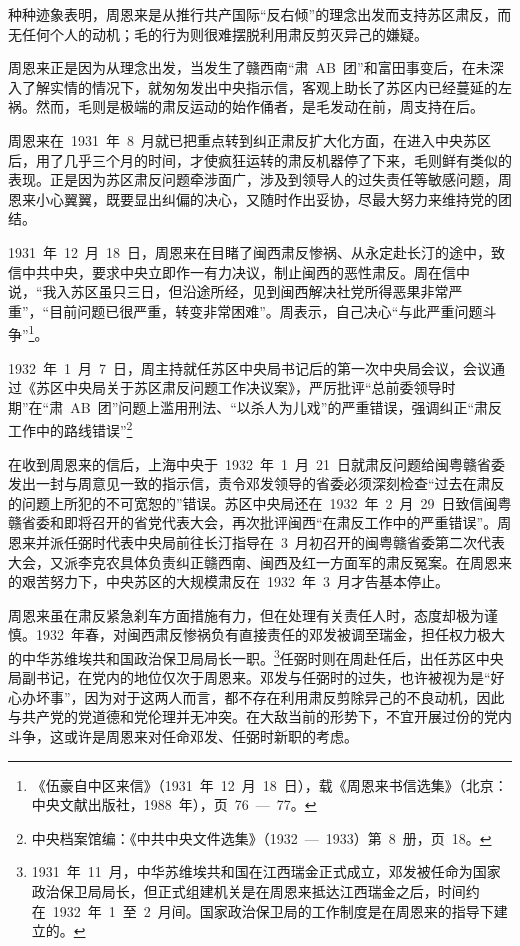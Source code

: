 种种迹象表明，周恩来是从推行共产国际“反右倾”的理念出发而支持苏区肃反，而无任何个人的动机；毛的行为则很难摆脱利用肃反剪灭异己的嫌疑。

周恩来正是因为从理念出发，当发生了赣西南“肃~AB~团”和富田事变后，在未深入了解实情的情况下，就匆匆发出中央指示信，客观上助长了苏区内已经蔓延的左祸。然而，毛则是极端的肃反运动的始作俑者，是毛发动在前，周支持在后。

周恩来在~1931~年~8~月就已把重点转到纠正肃反扩大化方面，在进入中央苏区后，用了几乎三个月的时间，才使疯狂运转的肃反机器停了下来，毛则鲜有类似的表现。正是因为苏区肃反问题牵涉面广，涉及到领导人的过失责任等敏感问题，周恩来小心翼翼，既要显出纠偏的决心，又随时作出妥协，尽最大努力来维持党的团结。

1931~年~12~月~18~日，周恩来在目睹了闽西肃反惨祸、从永定赴长汀的途中，致信中共中央，要求中央立即作一有力决议，制止闽西的恶性肃反。周在信中说，“我入苏区虽只三日，但沿途所经，见到闽西解决社党所得恶果非常严重”，“目前问题已很严重，转变非常困难”。周表示，自己决心“与此严重问题斗争”\footnote{《伍豪自中区来信》（1931~年~12~月~18~日），载《周恩来书信选集》（北京：中央文献出版社，1988~年），页~76~—~77。}。

1932~年~1~月~7~日，周主持就任苏区中央局书记后的第一次中央局会议，会议通过《苏区中央局关于苏区肃反问题工作决议案》，严厉批评“总前委领导时期”在“肃~AB~团”问题上滥用刑法、“以杀人为儿戏”的严重错误，强调纠正“肃反工作中的路线错误”\footnote{中央档案馆编：《中共中央文件选集》（1932~—~1933）第~8~册，页~18。}

在收到周恩来的信后，上海中央于~1932~年~1~月~21~日就肃反问题给闽粤赣省委发出一封与周意见一致的指示信，责令邓发领导的省委必须深刻检查“过去在肃反的问题上所犯的不可宽恕的”错误。苏区中央局还在~1932~年~2~月~29~日致信闽粤赣省委和即将召开的省党代表大会，再次批评闽西“在肃反工作中的严重错误”。周恩来并派任弼时代表中央局前往长汀指导在~3~月初召开的闽粤赣省委第二次代表大会，又派李克农具体负责纠正赣西南、闽西及红一方面军的肃反冤案。在周恩来的艰苦努力下，中央苏区的大规模肃反在~1932~年~3~月才告基本停止。

周恩来虽在肃反紧急刹车方面措施有力，但在处理有关责任人时，态度却极为谨慎。1932~年春，对闽西肃反惨祸负有直接责任的邓发被调至瑞金，担任权力极大的中华苏维埃共和国政治保卫局局长一职。\footnote{1931~年~11~月，中华苏维埃共和国在江西瑞金正式成立，邓发被任命为国家政治保卫局局长，但正式组建机关是在周恩来抵达江西瑞金之后，时间约在~1932~年~1~至~2~月间。国家政治保卫局的工作制度是在周恩来的指导下建立的。}任弼时则在周赴任后，出任苏区中央局副书记，在党内的地位仅次于周恩来。邓发与任弼时的过失，也许被视为是“好心办坏事”，因为对于这两人而言，都不存在利用肃反剪除异己的不良动机，因此与共产党的党道德和党伦理并无冲突。在大敌当前的形势下，不宜开展过份的党内斗争，这或许是周恩来对任命邓发、任弼时新职的考虑。

